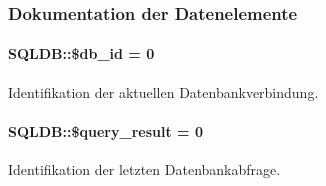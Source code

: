 \subsubsection{Dokumentation der Datenelemente}
\hypertarget{classSQLDB_2c62843044a6ec53ad3384fb36aa811b}{
\paragraph[\$db\_\-id]{\setlength{\rightskip}{0pt plus 5cm}SQLDB::\$db\_\-id = 0}\hfill}
\label{classSQLDB_2c62843044a6ec53ad3384fb36aa811b}


Identifikation der aktuellen Datenbankverbindung. 

\hypertarget{classSQLDB_879fa41a3df6664f4ce83960808326ab}{
\paragraph[\$query\_\-result]{\setlength{\rightskip}{0pt plus 5cm}SQLDB::\$query\_\-result = 0}\hfill}
\label{classSQLDB_879fa41a3df6664f4ce83960808326ab}


Identifikation der letzten Datenbankabfrage. 

